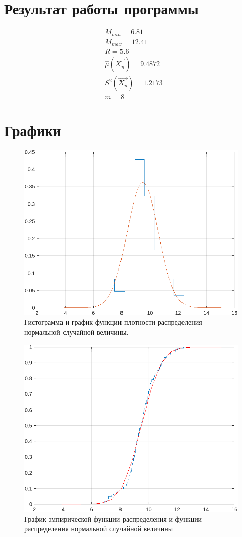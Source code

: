 \section{Результат работы программы}
\begin{equation*}
    \begin{split}
        &M_{min} = 6.81\\
        &M_{max} = 12.41\\
        &R = 5.6\\
        &\hat{\mu}(\Vec{X_n}) = 9.4872\\
        &S^2(\Vec{X_n}) = 1.2173\\
        &m = 8
    \end{split}
\end{equation*}
\newpage

\section{Графики}

\begin{figure}[h!]
    \centering
    \includegraphics[]{images/first_number.png}
    \caption{Гистограмма и график функции плотности распределения
нормальной случайной величины.}
\end{figure}

\begin{figure}[h!]
    \centering
    \includegraphics[]{images/second_number.png}
    \caption{График эмпирической функции распределения и функции
распределения нормальной случайной величины}
\end{figure}
